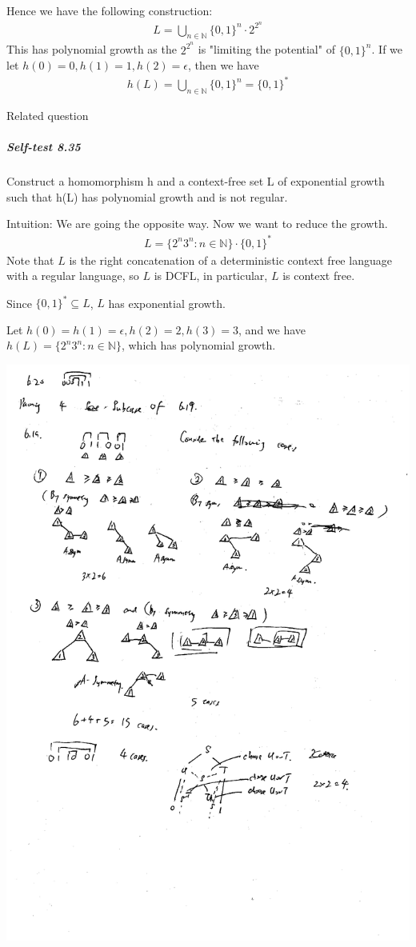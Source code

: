 \documentclass{article}
\begin{document}
Hence we have the following construction:
\begin{align*}
	L = \bigcup_{n\in \mathbb{N}} \{0,1\}^n\cdot 2^{2^n}
\end{align*}
This has polynomial growth as the $2^{2^n}$ is "limiting the potential" of $\{0,1\}^n$.
If we let $h(0)=0, h(1)=1, h(2)=\epsilon$, then we have
\begin{align*}
	h(L) = \bigcup_{n\in \mathbb{N}} \{0,1\}^n = \{0,1\}^*
\end{align*}


Related question
\subparagraph{Self-test 8.35} Construct a homomorphism h and a context-free set L of exponential growth such that h(L) has polynomial growth and is not regular.

Intuition: We are going the opposite way. Now we want to reduce the growth.
\begin{align*}
	L = \{2^n3^n : n\in \mathbb{N}\}\cdot \{0,1\}^*
\end{align*}
Note that $L$ is the right concatenation of a deterministic context free language with a regular language, so $L$ is DCFL, in particular, $L$ is context free.

Since $\{0,1\}^*\subseteq L$, $L$ has exponential growth.

Let $h(0) = h(1) = \epsilon, h(2) = 2, h(3) = 3$, and we have $h(L) = \{2^n3^n : n\in \mathbb{N}\}$, which has polynomial growth.

\includegraphics[scale=0.9]{qn6_19}
\end{document}
